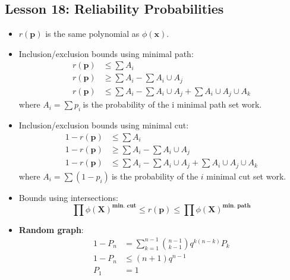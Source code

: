 \documentclass[10pt, french]{article}
\begin{document}
\begin{multicols*}{3}
\section*{Lesson 18: Reliability Probabilities}
\begin{itemize}[align=left,leftmargin=*]
    \item $r(\mathbf{p})$ is the same polynomial as $\phi(\mathbf{x})$.
    \item Inclusion/exclusion bounds using minimal path:
    \begin{align*}
        r(\mathbf{p}) &\leq \sum A_i \\
        r(\mathbf{p}) &\geq \sum A_i - \sum A_i \cup A_j \\
        r(\mathbf{p}) &\leq \sum A_i - \sum A_i \cup A_j + \sum A_i \cup A_j \cup A_k
    \end{align*}
    where $A_i=\sum p_i\:$is the probability of the i minimal path set work.
    \item Inclusion/exclusion bounds using minimal cut:
    \begin{align*}
        1 - r(\mathbf{p}) &\leq \sum A_i \\
        1 - r(\mathbf{p}) &\geq \sum A_i - \sum A_i \cup A_j \\
        1 - r(\mathbf{p}) &\leq \sum A_i - \sum A_i \cup A_j + \sum A_i \cup A_j \cup A_k
    \end{align*}
    where $A_i=\sum (1 - p_i)\:$is the probability of the $i$ minimal cut set work.
    \item Bounds using intersections: \[ \prod \phi(\mathbf{X})^{\textbf{min. cut}} \leq r(\mathbf{p}) \leq \prod \phi(\mathbf{X})^{\textbf{min. path}}\]
    \item \textbf{Random graph}:
    \begin{align*}
        1 - P_n &= \sum_{k=1}^{n-1} \binom{n-1}{k-1} q^{k(n-k)} P_k \\
        1 - P_n &\leq (n+1)q^{n-1} \\
        P_1 &= 1
    \end{align*}
\end{itemize}


\end{multicols*}
\end{document}
